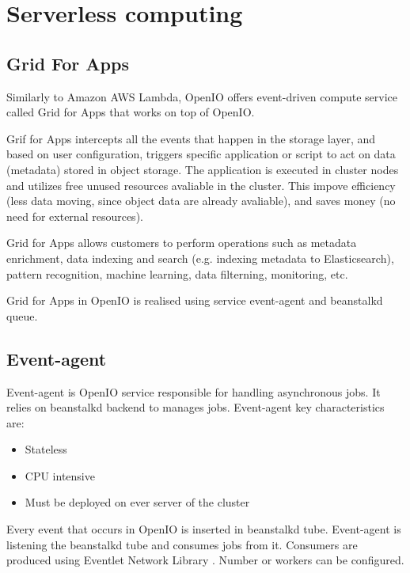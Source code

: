     \section{Serverless computing}
    \subsection{Grid For Apps}\label{sec:oioGridForApps}

    Similarly to Amazon AWS Lambda, OpenIO offers event-driven compute service called Grid for Apps that works on top of OpenIO.

    Grif for Apps intercepts all the events that happen in the storage layer, and based on user configuration, triggers specific application or script to act on data (metadata) stored in object storage\cite{oioNextGen}. The application is executed in cluster nodes and utilizes free unused resources avaliable in the cluster. This impove efficiency (less data moving, since object data are already avaliable), and saves money (no need for external resources)\cite{oioNextGen}.

    Grid for Apps allows customers to perform operations such as metadata enrichment, data indexing and search (e.g. indexing metadata to Elasticsearch), pattern recognition, machine learning, data filterning, monitoring, etc\cite{oioNextGen}.

    Grid for Apps in OpenIO is realised using service event-agent and beanstalkd queue.

    \subsection{Event-agent}
    Event-agent is OpenIO service responsible for handling asynchronous jobs. It relies on beanstalkd backend to manages jobs. Event-agent key characteristics are\cite{oioSdsServices}:
    \begin{itemize}
        \item Stateless
        \item CPU intensive
        \item Must be deployed on ever server of the cluster
    \end{itemize}

    Every event that occurs in OpenIO is inserted in beanstalkd tube. Event-agent is listening the beanstalkd tube and consumes jobs from it. Consumers are produced using Eventlet Network Library \cite{oioEventlet}. Number or workers can be configured.

